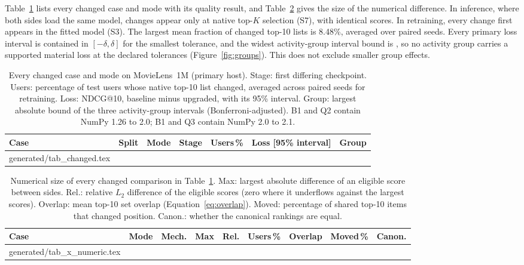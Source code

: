 \documentclass[11pt,a4paper]{article}
\makeatletter
\newcommand{\tablebody}[1]{\@@input generated/#1.tex }
\makeatother
\begin{document}
Table~\ref{tab:changed} lists every changed case and mode with its quality
result, and Table~\ref{tab:numeric} gives the size of the numerical difference.
In inference, where both sides load the same model, changes appear only at
native top-$K$ selection (S7), with identical scores. In retraining, every
change first appears in the fitted model (S3). The largest mean fraction of
changed top-10 lists is 8.48\%, averaged over paired seeds. Every primary
loss interval is contained in $[-\delta,\delta]$ for the smallest tolerance,
and the widest activity-group interval bound is \groupBound{}, so no activity
group carries a supported material loss at the declared tolerances
(Figure~\ref{fig:groups}). This does not exclude smaller group effects.

\begin{table}[htbp]
  \centering
  \caption{Every changed case and mode on MovieLens~1M (primary host). Stage:
    first differing checkpoint. Users: percentage of test users whose native
    top-10 list changed, averaged across paired seeds for retraining.
    Loss: NDCG@10, baseline minus upgraded, with its 95\%
    interval. Group: largest absolute bound of the three activity-group
    intervals (Bonferroni-adjusted). B1 and Q2 contain NumPy 1.26 to 2.0; B1
    and Q3 contain NumPy 2.0 to 2.1.}
  \label{tab:changed}
  \footnotesize\setlength{\tabcolsep}{3pt}
  \begin{tabular}{@{}lllcrlr@{}}
    \toprule
    Case & Split & Mode & Stage & Users\,\% & Loss [95\% interval] & Group \\
    \midrule
    \tablebody{tab_changed}
    \bottomrule
  \end{tabular}
\end{table}

\begin{table}[htbp]
  \centering
  \caption{Numerical size of every changed comparison in Table~\ref{tab:changed}.
    Max: largest absolute difference of an eligible score between sides.
    Rel.: relative $L_2$ difference of the eligible scores (zero where it
    underflows against the largest scores). Overlap: mean top-10 set overlap
    (Equation~\ref{eq:overlap}). Moved: percentage of shared top-10 items
    that changed position. Canon.: whether the canonical rankings are equal.}
  \label{tab:numeric}
  \footnotesize\setlength{\tabcolsep}{3pt}
  \begin{tabular}{@{}lllrrrrrc@{}}
    \toprule
    Case & Mode & Mech. & Max & Rel. & Users\,\% & Overlap & Moved\,\% & Canon. \\
    \midrule
    \tablebody{tab_x_numeric}
    \bottomrule
  \end{tabular}
\end{table}
\end{document}
